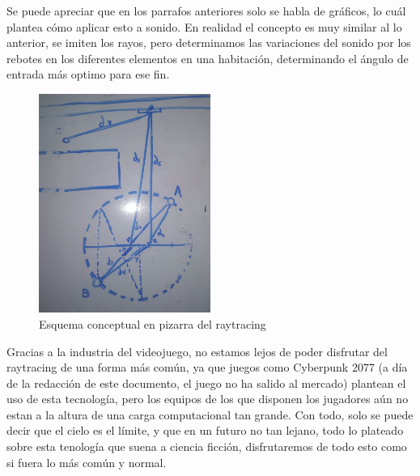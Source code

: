 \quad Se puede apreciar que en los parrafos anteriores solo se habla de gráficos, lo cuál plantea cómo aplicar esto a sonido. En realidad el concepto es muy similar al lo anterior, se imiten los rayos, pero determinamos las variaciones del sonido por los rebotes en los diferentes elementos en una habitación, determinando el ángulo de entrada más optimo para ese fin.\\

\begin{figure}[htb]
	\centering
	\includegraphics[width=0.5\textwidth]{./imagenes/pizarra}
	\caption{Esquema conceptual en pizarra del raytracing}
\end{figure} 

\quad Gracias a la industria del videojuego, no estamos lejos de poder disfrutar del raytracing de una forma más común, ya que juegos como Cyberpunk 2077 (a día de la redacción de este documento, el juego no ha salido al mercado) plantean el uso de esta tecnología, pero los equipos de los que disponen los jugadores aún no estan a la altura de una carga computacional tan grande. Con todo, solo se puede decir que el cielo es el límite, y que en un futuro no tan lejano, todo lo plateado sobre esta tenología que suena a ciencia ficción, disfrutaremos de todo esto como si fuera lo más común y normal.\\ 

\newpage


